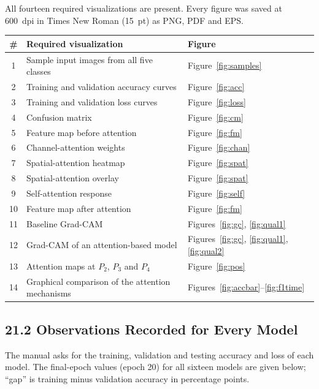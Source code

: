\documentclass[11pt]{article}
\begin{document}
All fourteen required visualizations are present. Every figure was saved at
600~dpi in Times New Roman (15~pt) as PNG, PDF and EPS.

\begin{center}
\small
\begin{tabular}{|c|l|l|}
\hline
\# & Required visualization & Figure\\
\hline
1 & Sample input images from all five classes & Figure~\ref{fig:samples}\\
2 & Training and validation accuracy curves & Figure~\ref{fig:acc}\\
3 & Training and validation loss curves & Figure~\ref{fig:loss}\\
4 & Confusion matrix & Figure~\ref{fig:cm}\\
5 & Feature map before attention & Figure~\ref{fig:fm}\\
6 & Channel-attention weights & Figure~\ref{fig:chan}\\
7 & Spatial-attention heatmap & Figure~\ref{fig:spat}\\
8 & Spatial-attention overlay & Figure~\ref{fig:spat}\\
9 & Self-attention response & Figure~\ref{fig:self}\\
10 & Feature map after attention & Figure~\ref{fig:fm}\\
11 & Baseline Grad-CAM & Figures~\ref{fig:gc}, \ref{fig:qual1}\\
12 & Grad-CAM of an attention-based model & Figures~\ref{fig:gc}, \ref{fig:qual1}, \ref{fig:qual2}\\
13 & Attention maps at $P_2$, $P_3$ and $P_4$ & Figure~\ref{fig:pos}\\
14 & Graphical comparison of the attention mechanisms & Figures~\ref{fig:accbar}--\ref{fig:f1time}\\
\hline
\end{tabular}
\end{center}

\subsection*{21.2 Observations Recorded for Every Model}

The manual asks for the training, validation and testing accuracy and loss
of each model. The final-epoch values (epoch 20) for all sixteen models are
given below; ``gap'' is training minus validation accuracy in percentage
points.
\end{document}
